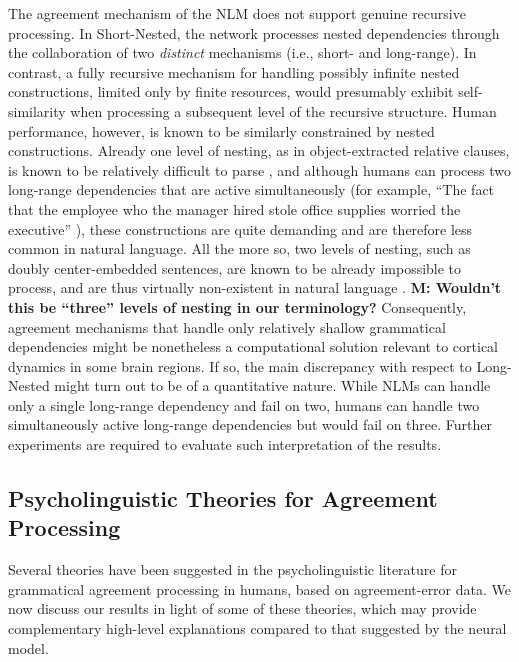 The agreement mechanism of the NLM does not support genuine recursive processing. In Short-Nested, the network processes nested dependencies through the collaboration of two \textit{distinct} mechanisms (i.e., short- and long-range). In contrast, a fully recursive mechanism for handling possibly infinite nested constructions, limited only by finite resources, would presumably exhibit self-similarity when processing a subsequent level of the recursive structure. Human performance, however, is known to be similarly constrained by nested constructions. Already one level of nesting, as in object-extracted relative clauses, is known to be relatively difficult to parse \citep[e.g.,][]{traxler2002processing}, and although humans can process two long-range dependencies that are active simultaneously (for example, ``The fact that the employee who the manager hired stole office supplies worried the executive'' \citep{Gibson:1998}), these constructions are quite demanding and are therefore less common in natural language. All the more so, two levels of nesting, such as doubly center-embedded sentences, are known to be already impossible to process, and are thus virtually non-existent in natural language \citep{}. \textbf{M: Wouldn't this be ``three'' levels of nesting in our terminology?} Consequently, agreement mechanisms that handle only relatively shallow grammatical dependencies might be nonetheless a computational solution relevant to cortical dynamics in some brain regions. If so, the main discrepancy with respect to Long-Nested might turn out to be of a quantitative nature. While NLMs can handle only a single long-range dependency and fail on two, humans can handle two simultaneously active long-range dependencies but would fail on three. Further experiments are required to evaluate such interpretation of the results.


\subsection{Psycholinguistic Theories for Agreement Processing}
Several theories have been suggested in the psycholinguistic literature for grammatical agreement processing in humans, based on agreement-error data. We now discuss our results in light of some of these theories, which may provide complementary high-level explanations compared to that suggested by the neural model. 

